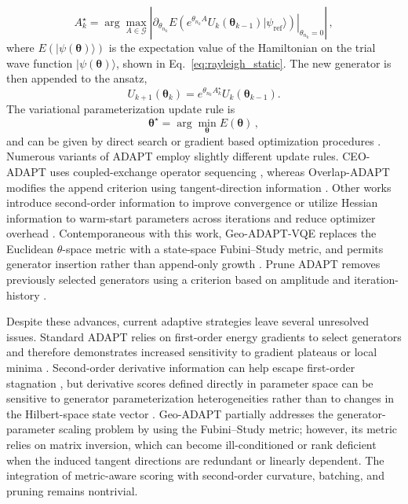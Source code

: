 \documentclass[
  reprint,
  amsmath,
  amssymb,
  aps,
  pra,
  nofootinbib,
  superscriptaddress,
  floatfix
]{revtex4-2}
\newcommand{\ket}[1]{|#1\rangle}
\begin{document}
\begin{equation}
A_k^\star=\arg\max_{A\in\mathcal G}
\left|
\left.
\partial_{\theta_{n_k}}E\!\left(e^{\theta_{n_k} A}U_k(\boldsymbol{\theta}_{k-1})\ket{\psi_{\mathrm{ref}}}\right)
\right|_{\theta_{n_k}=0}
\right|\,,
\label{eq:adapt_append_gradient}
\end{equation}
where $E(\ket{\psi(\boldsymbol{\theta})})$ is the expectation value of the Hamiltonian on the trial wave function $\ket{\psi(\boldsymbol{\theta})}$, shown in Eq.~\eqref{eq:rayleigh_static}. The new generator is then appended to the ansatz,
\begin{equation}
U_{k+1}(\boldsymbol{\theta}_{k})=e^{\theta_{n_k} A_k^\star}U_k(\boldsymbol{\theta}_{k-1}).
\label{eq:adapt_append_update}
\end{equation}
The variational parameterization update rule is
\begin{equation}
\label{eq:theta_opt}
\boldsymbol{\theta}^\star=\arg\min_{\boldsymbol{\theta}}E(\boldsymbol{\theta})\,,
\end{equation}
%
and can be given by direct search or gradient based optimization procedures \cite{BonetMonroig2023Optimizer,Singh2023Optimizers,Gacon2021QNSPSA}. Numerous variants of ADAPT employ slightly different update rules. CEO-ADAPT uses coupled-exchange operator sequencing \cite{Ramoa2025}, whereas Overlap-ADAPT modifies the append criterion using tangent-direction information \cite{Feniou2023}. Other works introduce second-order information to improve convergence \cite{Grimsley2023ADAPT} or utilize Hessian information to warm-start parameters across iterations and reduce optimizer overhead \cite{Ramoa2025HessianRecycling}.
Contemporaneous with this work, Geo-ADAPT-VQE replaces the Euclidean \(\theta\)-space metric with a state-space Fubini--Study metric, and permits generator insertion rather than append-only growth \cite{Sohail2026GeoADAPT}. Prune ADAPT removes previously selected generators using a criterion based on amplitude and iteration-history \cite{Vaquero2025PrunedADAPT}.

Despite these advances, current adaptive strategies leave several unresolved issues. Standard ADAPT relies on first-order energy gradients to select generators \cite{Grimsley2019,Tang2021,Yordanov2021} and therefore demonstrates increased sensitivity to gradient plateaus or local minima \cite{Feniou2023,Grimsley2023ADAPT}.
Second-order derivative information can help escape first-order stagnation \cite{Ramoa2025HessianRecycling}, but derivative scores defined directly in parameter space can be sensitive to generator parameterization heterogeneities rather than to changes in the Hilbert-space state vector \cite{ProvostVallee1980,Stokes2020QNG}. Geo-ADAPT partially addresses the generator-parameter scaling problem by using the Fubini--Study metric; however, its metric relies on matrix inversion, which can become ill-conditioned or rank deficient when the induced tangent directions are redundant or linearly dependent\cite{Sohail2026GeoADAPT}. The integration of metric-aware scoring with second-order curvature, batching, and pruning remains nontrivial.
\end{document}

